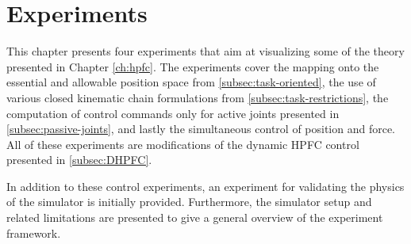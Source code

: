 \chapter{Experiments}\label{ch:results}

This chapter presents four experiments that aim at visualizing some of the theory presented in Chapter \ref{ch:hpfc}. The experiments cover the mapping onto the essential and allowable position space from \ref{subsec:task-oriented}, the use of various closed kinematic chain formulations from \ref{subsec:task-restrictions}, the computation of control commands only for active joints presented in \ref{subsec:passive-joints}, and lastly the simultaneous control of position and force. All of these experiments are modifications of the dynamic HPFC control presented in \ref{subsec:DHPFC}.

In addition to these control experiments, an experiment for validating the physics of the simulator is initially provided. Furthermore, the simulator setup and related limitations are presented to give a general overview of the experiment framework.











